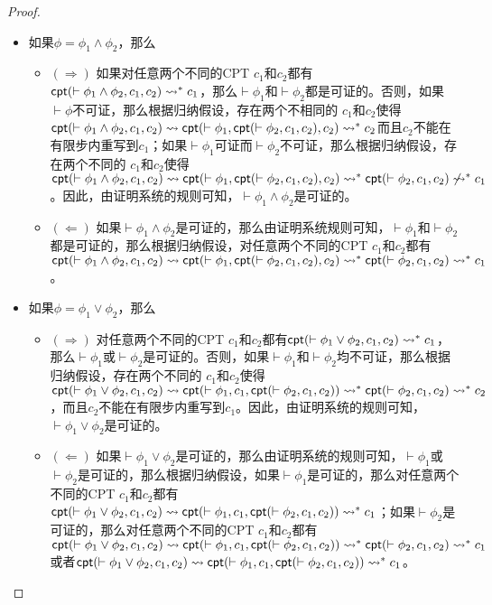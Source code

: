 \begin{proof}
\begin{itemize}
		\item 如果$\phi = \phi_1\wedge \phi_2$，那么
		\begin{itemize}
			\item $(\Rightarrow)$ 如果对任意两个不同的\textsf{CPT} $c_1$和$c_2$都有$\textsf{cpt}(\vdash\phi_1\wedge\phi_2, c_1, c_2)\rightsquigarrow^* c_1$，那么$\vdash\phi_1$和$\vdash\phi_2$都是可证的。否则，如果$\vdash\phi$不可证，那么根据归纳假设，存在两个不相同的\CPT{} $c_1$和$c_2$使得		$\textsf{cpt}(\vdash
			\phi_1\wedge\phi_2, c_1, c_2)\rightsquigarrow \textsf{cpt}(\vdash \phi_1, \textsf{cpt}(\vdash
			\phi_2, c_1, c_2), c_2)\rightsquigarrow^*c_2$而且$c_2$不能在有限步内重写到$c_1$；如果$\vdash\phi_1$可证而$\vdash\phi_2$不可证，那么根据归纳假设，存在两个不同的\CPT{} $c_1$和$c_2$使得$\textsf{cpt}(\vdash
			\phi_1\wedge\phi_2, c_1, c_2)\rightsquigarrow \textsf{cpt}(\vdash \phi_1, \textsf{cpt}(\vdash
			\phi_2, c_1, c_2), c_2)\rightsquigarrow^*\textsf{cpt}(\vdash
			\phi_2, c_1, c_2)\not\rightsquigarrow^*c_1$。因此，由证明系统的规则可知，$\vdash\phi_1\wedge\phi_2$是可证的。
			\item $(\Leftarrow)$ 如果$\vdash\phi_1\wedge\phi_2$是可证的，那么由证明系统规则可知，$\vdash\phi_1$和$\vdash\phi_2$都是可证的，那么根据归纳假设，对任意两个不同的\textsf{CPT} $c_1$和$c_2$都有$\textsf{cpt}(\vdash
			\phi_1\wedge\phi_2, c_1, c_2)\rightsquigarrow \textsf{cpt}(\vdash \phi_1, \textsf{cpt}(\vdash
			\phi_2, c_1, c_2), c_2) \rightsquigarrow^* \textsf{cpt}(\vdash \phi_2, c_1, c_2)\rightsquigarrow^*
			c_1$。
		\end{itemize}
		
		
		\item 如果$\phi = \phi_1\vee\phi_2$，那么
		\begin{itemize}
			\item $(\Rightarrow)$ 对任意两个不同的\textsf{CPT} $c_1$和$c_2$都有$\textsf{cpt}(\vdash \phi_1\vee\phi_2,
			c_1, c_2)\rightsquigarrow^* c_1$，那么$\vdash\phi_1$或$\vdash\phi_2$是可证的。否则，如果$\vdash\phi_1$和$\vdash\phi_2$均不可证，那么根据归纳假设，存在两个不同的\CPT{} $c_1$和$c_2$使得 
			$\textsf{cpt}(\vdash\phi_1\vee\phi_2, c_1,
			c_2)\rightsquigarrow \textsf{cpt}(\vdash \phi_1, c_1, \textsf{cpt}(\vdash\phi_2, c_1, c_2))\rightsquigarrow^*\textsf{cpt}(\vdash\phi_2, c_1, c_2)\rightsquigarrow^*
			c_2$，而且$c_2$不能在有限步内重写到$c_1$。因此，由证明系统的规则可知，$\vdash\phi_1\vee\phi_2$是可证的。
			\item $(\Leftarrow)$ 如果$\vdash\phi_1\vee\phi_2$是可证的，那么由证明系统的规则可知，$\vdash\phi_1$或$\vdash\phi_2$是可证的，那么根据归纳假设，如果$\vdash\phi_1$是可证的，那么对任意两个不同的\textsf{CPT} $c_1$和$c_2$都有$\textsf{cpt}(\vdash\phi_1\vee\phi_2, c_1,
			c_2)\rightsquigarrow \textsf{cpt}(\vdash \phi_1, c_1, \textsf{cpt}(\vdash\phi_2, c_1, c_2))\rightsquigarrow^*
			c_1$；如果$\vdash\phi_2$是可证的，那么对任意两个不同的\textsf{CPT} $c_1$和$c_2$都有$\textsf{cpt}(\vdash\phi_1\vee\phi_2, c_1, c_2)\rightsquigarrow \textsf{cpt}(\vdash
			\phi_1, c_1, \textsf{cpt}(\vdash\phi_2, c_1, c_2))\rightsquigarrow^* \textsf{cpt}(\vdash\phi_2,
			c_1, c_2) \rightsquigarrow^* c_1$或者$\textsf{cpt}(\vdash\phi_1\vee\phi_2, c_1, c_2)\rightsquigarrow \textsf{cpt}(\vdash
			\phi_1, c_1, \textsf{cpt}(\vdash\phi_2, c_1, c_2))\rightsquigarrow^* c_1$。
		\end{itemize}
		

\end{itemize}
\end{proof}
